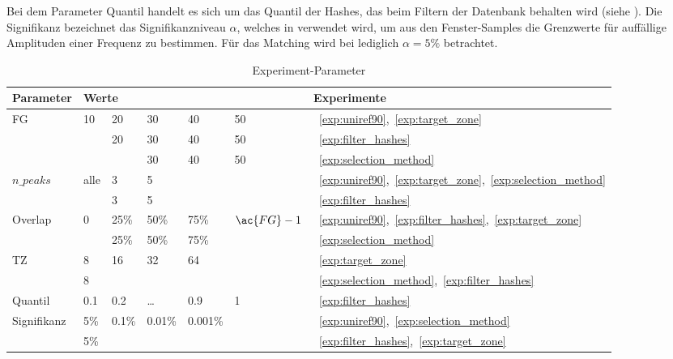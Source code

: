         \begin{table}[H]
            \centering
            \caption{Experiment-Parameter}
            \label{tab:parameter}
            \begin{minipage}{\textwidth}
                Bei dem Parameter Quantil handelt es sich um das Quantil der Hashes, das beim Filtern der Datenbank behalten wird (siehe ). Die Signifikanz bezeichnet das Signifikanzniveau $\alpha$, welches in  verwendet wird, um aus den Fenster-Samples die Grenzwerte für auffällige Amplituden einer Frequenz zu bestimmen. Für das Matching wird bei  lediglich $\alpha=5\%$ betrachtet.
            \end{minipage}
            \begin{tabular}{lllllll}
            \toprule
             \textbf{Parameter} & \multicolumn{5}{l}{\textbf{Werte}} & \textbf{Experimente}\\
             \midrule
             \acf{FG}    & 10 & 20    & 30     & 40     & 50        &~\ref{exp:uniref90},~\ref{exp:target_zone}\\
                         &    & 20    & 30     & 40     & 50        &~\ref{exp:filter_hashes}\\
                         &    &       & 30     & 40     & 50        &~\ref{exp:selection_method}\\
             $n\_peaks$  &alle& 3     & 5      &        &           &~\ref{exp:uniref90},~\ref{exp:target_zone},~\ref{exp:selection_method}\\
                         &    & 3     & 5      &        &           &~\ref{exp:filter_hashes}\\
             Overlap     & 0  & 25\%  & 50\%   & 75\%   &$\ac{FG}-1$&~\ref{exp:uniref90},~\ref{exp:filter_hashes},~\ref{exp:target_zone}\\
                         &    & 25\%  & 50\%   & 75\%   &           &~\ref{exp:selection_method}\\
             \acl{TZ}    & 8  & 16    & 32     & 64     &           &~\ref{exp:target_zone}\\
                         & 8  &       &        &        &           &~\ref{exp:selection_method},~\ref{exp:filter_hashes}\\
             Quantil     &0.1 & 0.2   & \dots  & 0.9    &     1     &~\ref{exp:filter_hashes}\\
             Signifikanz &5\% & 0.1\% & 0.01\% & 0.001\%&           &~\ref{exp:uniref90},~\ref{exp:selection_method}\\
                         &5\% &       &        &        &           &~\ref{exp:filter_hashes},~\ref{exp:target_zone}\\
             \bottomrule
            \end{tabular}
        \end{table}

